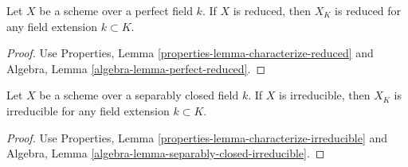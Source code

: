 \begin{lemma}
\label{lemma-perfect-reduced}
Let $X$ be a scheme over a perfect field $k$. If $X$ is reduced,
then $X_K$ is reduced for any field extension $k \subset K$.
\end{lemma}

\begin{proof}
Use Properties, Lemma \ref{properties-lemma-characterize-reduced}
and Algebra, Lemma \ref{algebra-lemma-perfect-reduced}.
\end{proof}

\begin{lemma}
\label{lemma-separably-closed-irreducible}
Let $X$ be a scheme over a separably closed field $k$. If $X$ is irreducible,
then $X_K$ is irreducible for any field extension $k \subset K$.
\end{lemma}

\begin{proof}
Use Properties, Lemma \ref{properties-lemma-characterize-irreducible}
and Algebra, Lemma \ref{algebra-lemma-separably-closed-irreducible}.
\end{proof}











